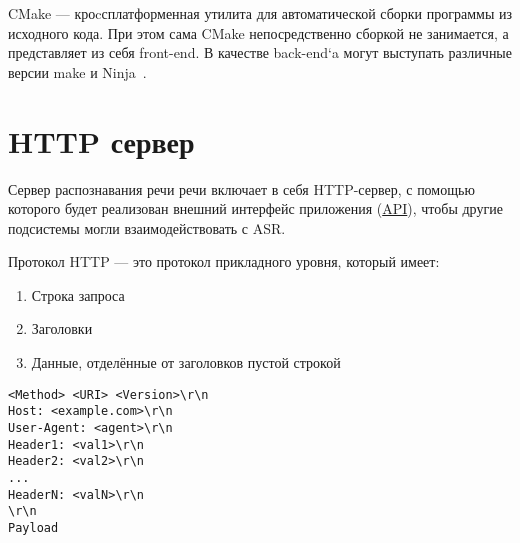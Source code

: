 CMake — кроcсплатформенная утилита для автоматической сборки программы из
исходного кода. При этом сама CMake непосредственно сборкой не занимается,
а представляет из себя front-end. В качестве back-end`a могут выступать
различные версии make и Ninja~\cite{cmake}.

\section{HTTP сервер}
Сервер распознавания речи речи включает в себя HTTP-сервер, с помощью которого
будет реализован внешний интерфейс приложения (\hyperlink{api}{API}), чтобы другие
подсистемы могли взаимодействовать с ASR.

Протокол HTTP --- это протокол прикладного уровня, который имеет:
\begin{enumerate}
    \item Строка запроса
    \item Заголовки
    \item Данные, отделённые от заголовков пустой строкой
\end{enumerate}

\begin{lstlisting}[caption={Общая структура HTTP протокола}, label={lst:http:struct}]
<Method> <URI> <Version>\r\n
Host: <example.com>\r\n
User-Agent: <agent>\r\n
Header1: <val1>\r\n
Header2: <val2>\r\n
...
HeaderN: <valN>\r\n
\r\n
Payload
\end{lstlisting}

